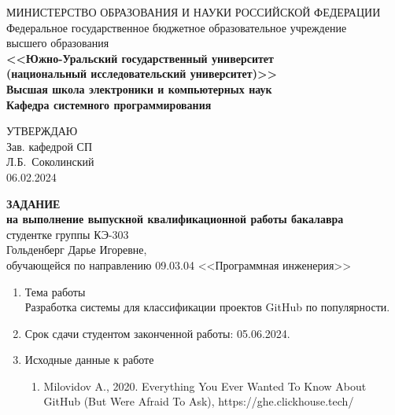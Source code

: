 \newpage
\thispagestyle{empty}

\begin{adjustwidth}{-1.5cm}{0.5cm}
\begin{linespread}{1}
\begin{center}


\small{
МИНИСТЕРСТВО ОБРАЗОВАНИЯ И НАУКИ РОССИЙСКОЙ ФЕДЕРАЦИИ\\
Федеральное государственное бюджетное образовательное учреждение\\
высшего образования\\
\textbf{<<Южно-Уральский государственный университет\\
(национальный исследовательский университет)>>\\
Высшая школа электроники и компьютерных наук\\
Кафедра системного программирования}
}



\vspace{2em}

\hfill{}
\parbox{7cm}{
УТВЕРЖДАЮ \\
Зав. кафедрой СП \\[0.5em]
\underfield{} Л.Б.~Соколинский \\[0.5em]
06.02.2024
}

\vspace{2em}

\textbf{ЗАДАНИЕ} \\
\textbf{на выполнение выпускной квалификационной работы бакалавра}\\
студентке группы КЭ-303\\
Гольденберг Дарье Игоревне,\\
обучающейся по направлению 09.03.04 <<Программная инженерия>> 

\end{center}

\vspace{2em}

{
\small
\begin{enumerate}
	\bf\item Тема работы \rm \\
	Разработка системы для классификации проектов GitHub по популярности.
	\bf\item Срок сдачи студентом законченной работы: \rm
	05.06.2024.

	\bf\item Исходные данные к работе\rm
	\begin{enumerate}%
		\raggedright
		\item Milovidov A., 2020. Everything You Ever Wanted To Know About GitHub (But Were Afraid To Ask), https://ghe.clickhouse.tech/
	\end{enumerate}


\end{enumerate}}
\end{linespread}
\end{adjustwidth}
